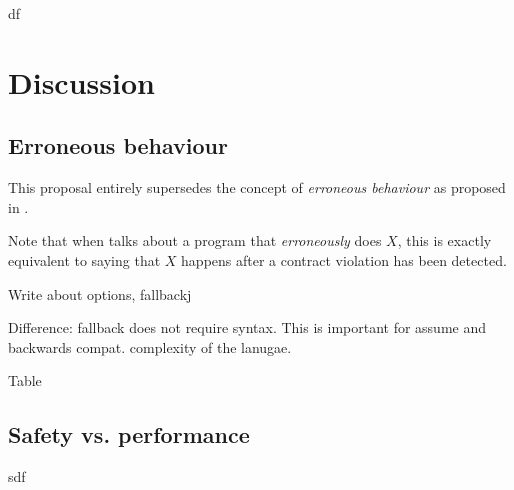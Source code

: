 df

\section{Discussion}

\subsection{Erroneous behaviour}

This proposal entirely supersedes the concept of \emph{erroneous behaviour} as proposed in \cite{P2795R5}.

Note that when \cite{P2795R5} talks about a program that \emph{erroneously} does $X$, this is exactly equivalent to saying that $X$ happens after a contract violation has been detected.

Write about options,  fallbackj

Difference: fallback does not require syntax. This is important for assume and backwards compat. complexity of the lanugae.

Table


\subsection{Safety vs. performance}

sdf





\renewcommand{\bibname}{References}




